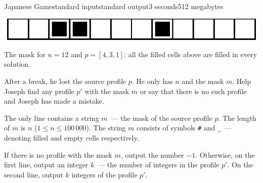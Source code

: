 \begin{problem}{Japanese Game}{standard input}{standard output}{3 seconds}{512 megabytes}
\begin{center}
\includegraphics[scale=1]{004.eps}

The mask for $n = 12$ and $p = [4, 3, 1]$: all the filled cells above are filled in every solution.
\end{center}

After a break, he lost the source profile $p$. He only has $n$ and the mask $m$. Help Joseph find any profile $p'$ with the mask $m$ or say that there is no such profile and Joseph has made a mistake.

\InputFile
The only line contains a string $m$~--- the mask of the source profile $p$.
The length of $m$ is $n$ ($1 \le n \le 100\,000$).
The string $m$ consists of symbols \texttt{\#} and \texttt{\_}~--- denoting filled and empty cells respectively.


\OutputFile
If there is no profile with the mask $m$, output the number $-1$.
Otherwise, on the first line, output an integer $k$~--- the number of integers in the profile $p'$. 
On the second line, output $k$ integers of the profile $p'$.

\Examples

\begin{example}
%
%
%
\end{example}

\end{problem}

